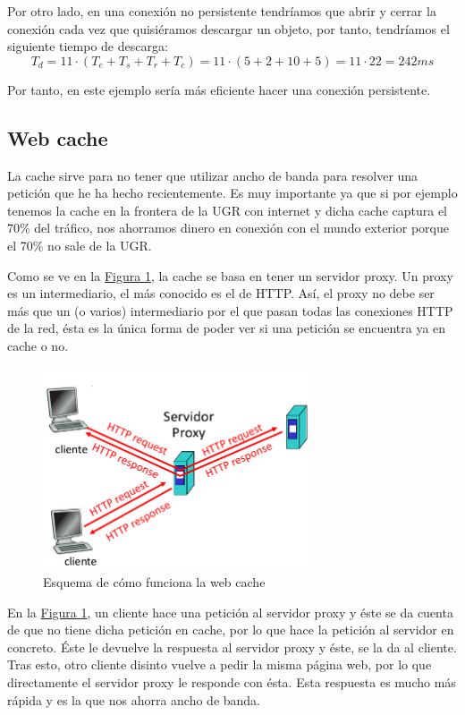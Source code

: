 \documentclass[10pt,a4paper,spanish]{report}
\begin{document}
Por otro lado, en una conexión no persistente tendríamos que abrir y cerrar la conexión cada vez que quisiéramos descargar un objeto, por tanto, tendríamos el siguiente tiempo de descarga:
\begin{displaymath}
  T_d = 11 \cdot (T_e + T_s + T_r + T_c) = 11 \cdot (5 + 2 + 10 + 5) = 11 \cdot 22 = 242 ms
\end{displaymath}

Por tanto, en este ejemplo sería más eficiente hacer una conexión persistente.

\subsection{\textcolor{tema2}Web cache}
La cache sirve para no tener que utilizar ancho de banda para resolver una petición que he ha hecho recientemente. Es muy importante ya que si por ejemplo tenemos la cache en la frontera de la UGR con internet y dicha cache captura el 70\% del tráfico, nos ahorramos dinero en conexión con el mundo exterior porque el 70\% no sale de la UGR.

Como se ve en la \hyperref[webcache]{Figura \ref*{webcache}}, la cache se basa en tener un servidor proxy. Un proxy es un intermediario, el más conocido es el de HTTP. Así, el proxy no debe ser más que un (o varios) intermediario por el que pasan todas las conexiones HTTP de la red, ésta es la única forma de poder ver si una petición se encuentra ya en cache o no.

  \begin{figure}[!h]
    \centering
    \includegraphics[width=0.7\textwidth]{tema2_7}
    \caption{Esquema de cómo funciona la web cache}
    \label{webcache}
  \end{figure}

En la \hyperref[webcache]{Figura \ref*{webcache}}, un cliente hace una petición al servidor proxy y éste se da cuenta de que no tiene dicha petición en cache, por lo que hace la petición al servidor en concreto. Éste le devuelve la respuesta al servidor proxy y éste, se la da al cliente. Tras esto, otro cliente disinto vuelve a pedir la misma página web, por lo que directamente el servidor proxy le responde con ésta. Esta respuesta es mucho más rápida y es la que nos ahorra ancho de banda.
\end{document}
